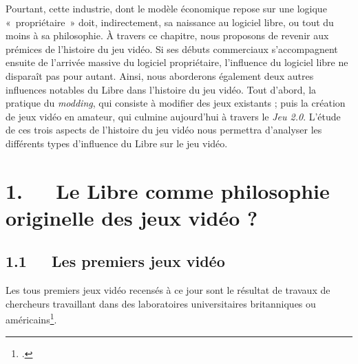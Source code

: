 \documentclass{FramateX}
\begin{document}
\begin{refsection}
Pourtant, cette industrie, dont le modèle économique repose sur une
logique «~propriétaire~» doit, indirectement, sa naissance au logiciel
libre, ou tout du moins à sa philosophie. À travers ce chapitre, nous
proposons de revenir aux prémices de l'histoire du jeu vidéo. Si ses
débuts commerciaux s'accompagnent ensuite de l'arrivée massive du
logiciel propriétaire, l'influence du logiciel libre ne disparaît pas
pour autant. Ainsi, nous aborderons également deux autres influences
notables du Libre dans l'histoire du jeu vidéo. Tout d'abord, la
pratique du \textit{modding}, qui consiste à
modifier des jeux existants ; puis la création de jeux vidéo en
amateur, qui culmine aujourd'hui à travers le \textit{Jeu 2.0}. L'étude de ces trois
aspects de l'histoire du jeu vidéo nous permettra d'analyser les
différents types d'influence du Libre sur le jeu vidéo.




\section*{1.~~~Le Libre comme philosophie originelle des jeux vidéo ?}
{}



\subsection*{1.1~~~Les premiers jeux vidéo}
{}



Les tous premiers jeux vidéo recensés à ce jour sont le résultat de
travaux de chercheurs travaillant dans des laboratoires universitaires
britanniques ou américains\footnote{\cite{djaoutiles2010}.}. 


\end{refsection}
\end{document}
